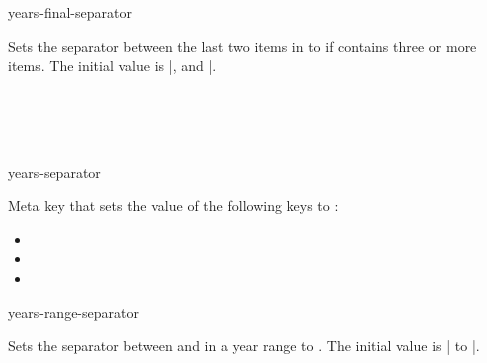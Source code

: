 \documentclass{beerydoc}
\begin{document}
\begin{codedoc}{years-final-separator}
  \begin{syntax}
  \end{syntax}
  Sets the separator between the last two items in  to
   if  contains three or more items.
  The initial value is |, and |.
  \begin{codedemo}
    \\
    \\
    \\
  \end{codedemo}
\end{codedoc}

\begin{codedoc}{years-separator}
  \begin{syntax}
  \end{syntax}
  Meta key that sets the value of the following keys to :
  \begin{itemize}
    \item {}
    \item {}
    \item {}
  \end{itemize}
\end{codedoc}

\begin{codedoc}{years-range-separator}
  \begin{syntax}
  \end{syntax}
  Sets the separator between  and  in a year range
  to .
  The initial value is | to |.
  \begin{codedemo}
    \\
    \\
    \\
    \\
    \\
  \end{codedemo}
\end{codedoc}
\end{document}
